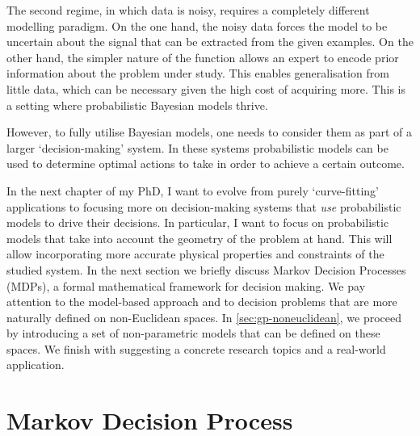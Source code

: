 The second regime, in which data is noisy, requires a completely different modelling paradigm. On the one hand, the noisy data forces the model to be uncertain about the signal that can be extracted from the given examples. On the other hand, the simpler nature of the function allows an expert to encode prior information about the problem under study. This enables generalisation from little data, which can be necessary given the high cost of acquiring more. This is a setting where probabilistic Bayesian models thrive.

However, to fully utilise Bayesian models, one needs to consider them as part of a larger `decision-making' system. In these systems probabilistic models can be used to determine optimal actions to take in order to achieve a certain outcome. %

In the next chapter of my PhD, I want to evolve from purely `curve-fitting' applications to focusing more on decision-making systems that \emph{use} probabilistic models to drive their decisions. In particular, I want to focus on probabilistic models that take into account the geometry of the problem at hand. This will allow incorporating more accurate physical properties and constraints of the studied system. In the next section we briefly discuss Markov Decision Processes (MDPs), a formal mathematical framework for decision making. We pay attention to the model-based approach and to decision problems that are more naturally defined on non-Euclidean spaces. In \cref{sec:gp-noneuclidean}, we proceed by introducing a set of non-parametric models that can be defined on these spaces. We finish with suggesting a concrete research topics and a real-world application.


\section{Markov Decision Process}
\label{section:mdp}

